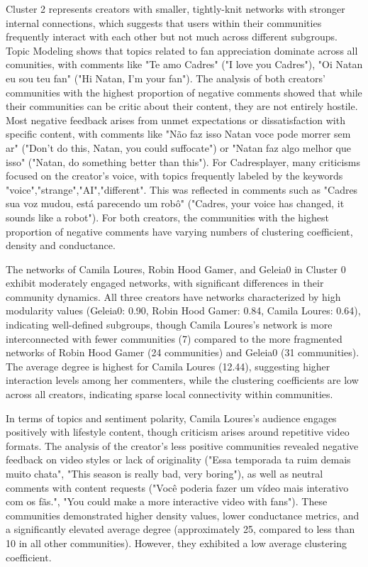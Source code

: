 \documentclass[sigconf]{acmart}
\begin{document}
Cluster 2 represents creators with smaller, tightly-knit networks with stronger internal connections,
which suggests that users within their communities frequently interact with each other but not much across
different subgroups. Topic Modeling shows that topics related to fan appreciation dominate across 
all comunities, with comments like "Te amo Cadres" ("I love you Cadres"), "Oi Natan eu sou teu fan"
("Hi Natan, I'm your fan"). 
The analysis of both creators' communities with the highest proportion of negative comments showed that
while their communities can be critic about their content, they are not entirely hostile.
Most negative feedback arises from unmet expectations or dissatisfaction with specific content, 
with comments like "Não faz isso Natan voce pode morrer sem ar" ("Don't do this, Natan, you could suffocate")
or "Natan faz algo melhor que isso" ("Natan, do something better than this"). 
For Cadresplayer, many criticisms focused on the creator's voice, with topics frequently labeled by
the keywords "voice","strange","AI","different". This was reflected in comments such as "Cadres sua voz 
mudou, está parecendo um robô" ("Cadres, your voice has changed, it sounds like a robot").
For both creators, the communities with the highest proportion of negative comments have varying numbers
of clustering coefficient, density and conductance.

The networks of Camila Loures, Robin Hood Gamer, and Geleia0 in Cluster 0 exhibit 
moderately engaged networks, with significant differences in their community dynamics. 
All three creators have networks characterized by high modularity values (Geleia0: 0.90, Robin Hood Gamer: 
0.84, Camila Loures: 0.64), indicating well-defined subgroups, though Camila Loures’s network is 
more interconnected with fewer communities (7) compared to the more fragmented networks of Robin Hood Gamer 
(24 communities) and Geleia0 (31 communities). 
The average degree is highest for Camila Loures (12.44), suggesting higher 
interaction levels among her commenters, while the clustering coefficients are low across all creators, 
indicating sparse local connectivity within communities. 

In terms of topics and sentiment polarity, Camila Loures's 
audience engages positively with lifestyle content, though criticism arises around repetitive 
video formats.
The analysis of the creator's less positive communities revealed negative feedback on 
video styles or lack of originality ("Essa temporada ta ruim demais muito chata", "This season is really bad, very boring"), 
as well as neutral comments with content requests ("Você poderia fazer um vídeo mais interativo com os fãs.", 
"You could make a more interactive video with fans").
These communities demonstrated higher density values, lower conductance metrics, and a significantly 
elevated average degree (approximately 25, compared to less than 10 in all other communities). 
However, they exhibited a low average clustering coefficient.
\end{document}
